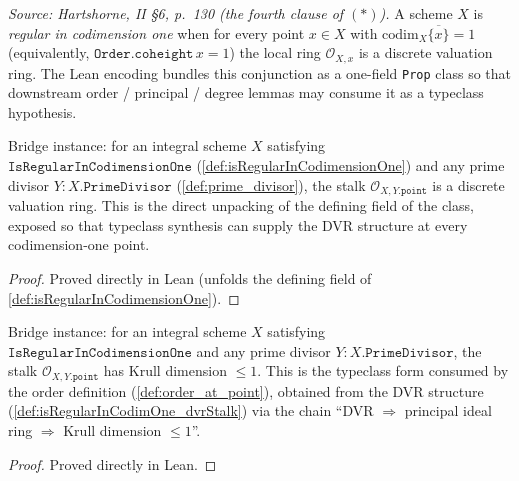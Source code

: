 \begin{definition}
  \label{def:isRegularInCodimensionOne}
  \textit{Source: Hartshorne, II \S6, p.~130 (the fourth clause of \((\ast)\)).}
  A scheme \(X\) is \emph{regular in codimension one} when for every point
  \(x \in X\) with \(\mathrm{codim}_X \overline{\{x\}} = 1\) (equivalently,
  \(\texttt{Order.coheight}\,x = 1\)) the local ring \(\mathcal O_{X,x}\) is
  a discrete valuation ring. The Lean encoding bundles this conjunction as
  a one-field \texttt{Prop} class so that downstream order / principal /
  degree lemmas may consume it as a typeclass hypothesis.
\end{definition}
\begin{definition}

  \label{def:isRegularInCodimOne_dvrStalk}
  Bridge instance: for an integral scheme \(X\) satisfying
  \(\texttt{IsRegularInCodimensionOne}\) (\ref{def:isRegularInCodimensionOne})
  and any prime divisor \(Y : X.\texttt{PrimeDivisor}\)
  (\ref{def:prime_divisor}), the stalk
  \(\mathcal O_{X, Y.\texttt{point}}\) is a discrete valuation ring. This is
  the direct unpacking of the defining field of the class, exposed so that
  typeclass synthesis can supply the DVR structure at every codimension-one
  point.
\end{definition}
\begin{proof}
  Proved directly in Lean (unfolds the defining field of
  \ref{def:isRegularInCodimensionOne}).
\end{proof}
\begin{definition}

  \label{def:isRegularInCodimOne_krullDimStalk}
  Bridge instance: for an integral scheme \(X\) satisfying
  \(\texttt{IsRegularInCodimensionOne}\) and any prime divisor
  \(Y : X.\texttt{PrimeDivisor}\), the stalk
  \(\mathcal O_{X, Y.\texttt{point}}\) has Krull dimension \(\leq 1\). This is
  the typeclass form consumed by the order definition
  (\ref{def:order_at_point}), obtained from the DVR structure
  (\ref{def:isRegularInCodimOne_dvrStalk}) via the chain
  ``DVR \(\Rightarrow\) principal ideal ring \(\Rightarrow\) Krull dimension
  \(\leq 1\)''.
\end{definition}
\begin{proof}
  Proved directly in Lean.
\end{proof}
